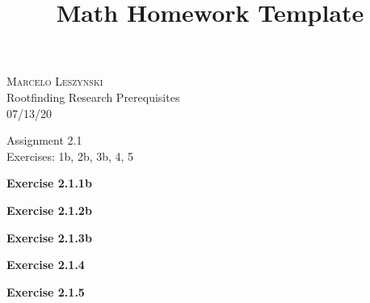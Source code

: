 \documentclass[12pt,oneside]{article}
\newenvironment{exercise}[1]{\vspace{.1in}\noindent\textbf{Exercise #1 \hspace{.05em}}}{}
\begin{document}
\title{Math Homework Template}

\begin{flushright}
\textsc{Marcelo Leszynski}  \\
Rootfinding Research Prerequisites\\
07/13/20
\end{flushright}

\begin{center}
\textsf{Assignment 2.1 } \\
\textsf{Exercises: 1b, 2b, 3b, 4, 5 }
\end{center}


\begin{exercise}{2.1.1b}

\end{exercise}


\begin{exercise}{2.1.2b}

\end{exercise}


\begin{exercise}{2.1.3b}

\end{exercise}


\begin{exercise}{2.1.4}

\end{exercise}


\begin{exercise}{2.1.5}

\end{exercise}


\end{document}
